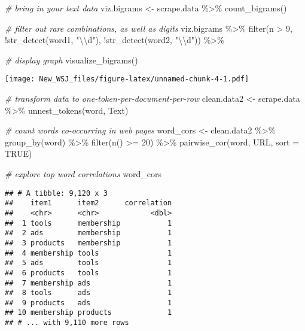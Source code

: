 \documentclass[
]{article}
\newenvironment{Shaded}{\begin{snugshade}}{\end{snugshade}}
\newcommand{\AttributeTok}[1]{\textcolor[rgb]{0.77,0.63,0.00}{#1}}
\newcommand{\CommentTok}[1]{\textcolor[rgb]{0.56,0.35,0.01}{\textit{#1}}}
\newcommand{\ConstantTok}[1]{\textcolor[rgb]{0.00,0.00,0.00}{#1}}
\newcommand{\DecValTok}[1]{\textcolor[rgb]{0.00,0.00,0.81}{#1}}
\newcommand{\FunctionTok}[1]{\textcolor[rgb]{0.00,0.00,0.00}{#1}}
\newcommand{\NormalTok}[1]{#1}
\newcommand{\OtherTok}[1]{\textcolor[rgb]{0.56,0.35,0.01}{#1}}
\newcommand{\SpecialCharTok}[1]{\textcolor[rgb]{0.00,0.00,0.00}{#1}}
\newcommand{\StringTok}[1]{\textcolor[rgb]{0.31,0.60,0.02}{#1}}
\begin{document}
\begin{Shaded}
\begin{Highlighting}[]
\CommentTok{\# bring in your text data}
\NormalTok{viz.bigrams }\OtherTok{\textless{}{-}}\NormalTok{ scrape.data }\SpecialCharTok{\%\textgreater{}\%}
  \FunctionTok{count\_bigrams}\NormalTok{()}

\CommentTok{\# filter out rare combinations, as well as digits}
\NormalTok{viz.bigrams }\SpecialCharTok{\%\textgreater{}\%}
  \FunctionTok{filter}\NormalTok{(n }\SpecialCharTok{\textgreater{}} \DecValTok{9}\NormalTok{,}
         \SpecialCharTok{!}\FunctionTok{str\_detect}\NormalTok{(word1, }\StringTok{"}\SpecialCharTok{\textbackslash{}\textbackslash{}}\StringTok{d"}\NormalTok{),}
         \SpecialCharTok{!}\FunctionTok{str\_detect}\NormalTok{(word2, }\StringTok{"}\SpecialCharTok{\textbackslash{}\textbackslash{}}\StringTok{d"}\NormalTok{)) }\SpecialCharTok{\%\textgreater{}\%}
  
\CommentTok{\# display graph}
  \FunctionTok{visualize\_bigrams}\NormalTok{()}
\end{Highlighting}
\end{Shaded}

\texttt{[image: New\_WSJ\_files/figure-latex/unnamed-chunk-4-1.pdf]}

\begin{Shaded}
\begin{Highlighting}[]
\CommentTok{\# transform data to one{-}token{-}per{-}document{-}per{-}row}
\NormalTok{clean.data2 }\OtherTok{\textless{}{-}}\NormalTok{ scrape.data }\SpecialCharTok{\%\textgreater{}\%}
  \FunctionTok{unnest\_tokens}\NormalTok{(word, Text)}

\CommentTok{\# count words co{-}occurring in web pages}
\NormalTok{word\_cors }\OtherTok{\textless{}{-}}\NormalTok{ clean.data2 }\SpecialCharTok{\%\textgreater{}\%}
  \FunctionTok{group\_by}\NormalTok{(word) }\SpecialCharTok{\%\textgreater{}\%}
  \FunctionTok{filter}\NormalTok{(}\FunctionTok{n}\NormalTok{() }\SpecialCharTok{\textgreater{}=} \DecValTok{20}\NormalTok{) }\SpecialCharTok{\%\textgreater{}\%}
  \FunctionTok{pairwise\_cor}\NormalTok{(word, URL, }\AttributeTok{sort =} \ConstantTok{TRUE}\NormalTok{)}

\CommentTok{\# explore top word correlations}
\NormalTok{word\_cors}
\end{Highlighting}
\end{Shaded}

\begin{verbatim}
## # A tibble: 9,120 x 3
##    item1      item2      correlation
##    <chr>      <chr>            <dbl>
##  1 tools      membership           1
##  2 ads        membership           1
##  3 products   membership           1
##  4 membership tools                1
##  5 ads        tools                1
##  6 products   tools                1
##  7 membership ads                  1
##  8 tools      ads                  1
##  9 products   ads                  1
## 10 membership products             1
## # ... with 9,110 more rows
\end{verbatim}
\end{document}
